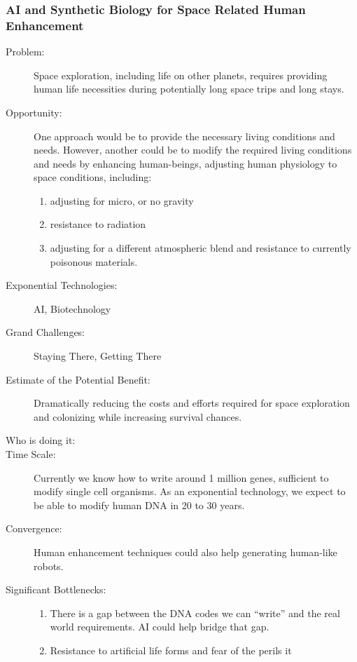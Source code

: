  
\subsubsection{AI and Synthetic Biology for Space Related Human  Enhancement}
\begin{description}
\item[Problem:]Space exploration, including life  on other planets, requires providing human life necessities during  potentially long space trips and long stays. 
 
 \item[Opportunity:] One approach would be to provide  the necessary living conditions and needs. However, another could be to  modify the required living conditions and needs by enhancing  human-beings, adjusting human physiology to space conditions, 
including:
\hfill\begin{enumerate}
\item adjusting for micro, or no  gravity
\item resistance to radiation
\item adjusting for a different  atmospheric blend and resistance to currently poisonous materials.
 \end{enumerate}
 \item[Exponential Technologies:] AI, Biotechnology
 \item[Grand Challenges:] Staying There, Getting There
 \item[Estimate of the Potential  Benefit:]
 Dramatically reducing the costs  and efforts required for space exploration and colonizing while  increasing survival chances.
 \item[Who is doing it:]
 \item[Time Scale:] Currently we know how to write around 1  million genes, sufficient to modify single cell organisms. As an  exponential technology, we expect to be 
able to  modify human DNA in 20 to 30 years.
 \item[Convergence:] Human enhancement techniques  could also help generating human-like robots.
 \item[Significant  Bottlenecks:]
 \hfill\begin{enumerate}
 \item There is a gap between the DNA  codes we can ``write'' and the real world requirements. AI could help bridge  that gap.
 \item Resistance to artificial life  forms and fear of the perils it 
 \end{enumerate}
  \end{description}



